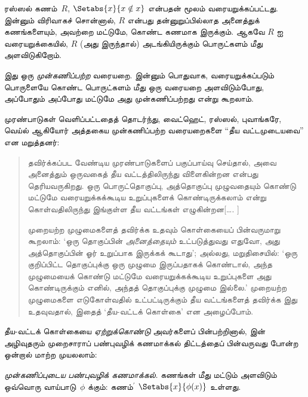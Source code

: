 \documentclass[../../../include/open-logic-section]{subfiles}
\begin{document}


ரஸ்ஸல் கணம்~$R$, $\Setabs{x}{x \notin x}$ என்பதன் மூலம்
வரையறுக்கப்பட்டது. இன்னும் விரிவாகச் சொன்னால், $R$ என்பது
தன்னுறுப்பில்லாத அனைத்துக் கணங்களையும், அவற்றை மட்டுமே, கொண்ட கணமாக
இருக்கும்.
ஆகவே $R$ ஐ வரையறுக்கையில், $R$ (அது இருந்தால்) அடங்கியிருக்கும்
பொருட்களம் மீது அளவிடுகிறோம்.

இது ஒரு \emph{முன்கணிப்பற்ற} வரையறை. இன்னும் பொதுவாக, வரையறுக்கப்படும்
பொருளையே கொண்ட பொருட்களம் மீது ஒரு வரையறை அளவிடும்போது, அப்போதும்
அப்போது மட்டுமே அது முன்கணிப்பற்றது என்று கூறலாம்.
	
முரண்பாடுகள் வெளிப்பட்டதைத் தொடர்ந்து, வைட்ஹெட், ரஸ்ஸல், புவாங்கரே,
வெய்ல் ஆகியோர் அத்தகைய முன்கணிப்பற்ற வரையறைகளை “தீய வட்டமுடையவை”
என மறுத்தனர்:
\begin{quote}
	தவிர்க்கப்பட வேண்டிய முரண்பாடுகளைப் பகுப்பாய்வு செய்தால், அவை அனைத்தும்
	ஒருவகைத் தீய வட்டத்திலிருந்து விளைகின்றன என்பது தெரியவருகிறது. ஒரு
	பொருட்தொகுப்பு, அத்தொகுப்பு முழுவதையும் கொண்டு மட்டுமே வரையறுக்கக்கூடிய
	உறுப்புகளைக் கொண்டிருக்கலாம் என்று கொள்வதிலிருந்து இங்குள்ள தீய
	வட்டங்கள் எழுகின்றன[\ldots. \textparagraph]

	முறையற்ற முழுமைகளைத் தவிர்க்க உதவும் கொள்கையைப் பின்வருமாறு கூறலாம்:
	‘ஒரு தொகுப்பின் \emph{அனைத்தையும்} உட்படுத்துவது எதுவோ, அது அத்தொகுப்பின்
	ஓர் உறுப்பாக இருக்கக் கூடாது’; அல்லது, மறுதிசையில்: ‘ஒரு குறிப்பிட்ட
	தொகுப்புக்கு ஒரு முழுமை இருப்பதாகக் கொண்டால், அந்த முழுமையைக் கொண்டு
	மட்டுமே வரையறுக்கக்கூடிய உறுப்புகளை அது கொண்டிருக்கும் எனில், அந்தத்
	தொகுப்புக்கு முழுமை இல்லை.’ முறையற்ற முழுமைகளை எடுகோள்வதில்
	உட்பட்டிருக்கும் தீய வட்டங்களைத் தவிர்க்க இது உதவுவதால், இதைத்
	‘தீய-வட்டக் கொள்கை’ என அழைப்போம்.
	\citep[p.~37]{WhiteheadRussell1910}
\end{quote}
தீய-வட்டக் கொள்கையை \emph{ஏற்றுக்கொண்டு} அவர்களைப் பின்பற்றினால்,
 இன் அழிவுதரும் முறைசாராப் பண்புவழிக்
கணமாக்கல் திட்டத்தைப் பின்வருவது போன்ற ஒன்றால் மாற்ற முயலலாம்:

\begin{defish}
\emph{முன்கணிப்புடைய பண்புவழிக் கணமாக்கல்.} கணங்கள் மீது மட்டும் அளவிடும்
ஒவ்வொரு வாய்பாடு~$\phi$ க்கும்: கணம்$^\prime$
$\Setabs{x}{\phi(x)}$ உள்ளது.
\end{defish}
\end{document}
